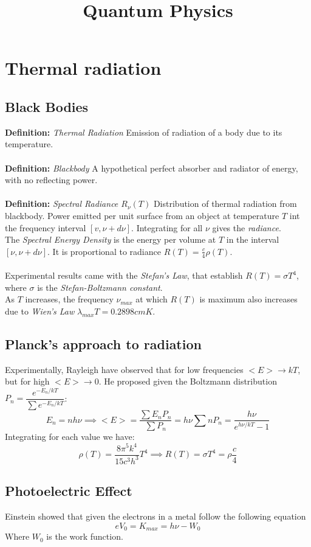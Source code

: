 \documentclass{myclass}
\title{Quantum Physics}
\newcommand{\defi}[1]{\textbf{Definition:} \textit{#1}}
\begin{document}
\maketitle
\tableofcontents
\newpage

\section{Thermal radiation}
\subsection{Black Bodies}
\defi{Thermal Radiation} Emission of radiation of a body due to its temperature. \\
\\
\defi{Blackbody} A hypothetical perfect absorber and radiator of energy, with no reflecting power.\\
\\
\defi{Spectral Radiance $R_\nu(T)$} Distribution of thermal radiation from blackbody. Power emitted per unit surface from an object at temperature $T$ int the frequency interval $[v, \nu + d\nu]$. Integrating for all $\nu$ gives the \textit{radiance}. \\
The \textit{Spectral Energy Density} is the energy per volume at $T$ in the interval $[\nu, \nu + d\nu]$. It is proportional to radiance $R(T)=\frac{c}{4}\rho(T)$. \\
\\
Experimental results came with the \textit{Stefan's Law}, that establish $R(T)=\sigma T^4$, where $\sigma$ is the \textit{Stefan-Boltzmann constant}. \\ As $T$ increases, the frequency $\nu_{max}$ at which $R(T)$ is maximum also increases due to \textit{Wien's Law} $\lambda_{max}T=0.2898 cmK$.

\subsection{Planck's approach to radiation}
Experimentally, Rayleigh have observed that for low frequencies $<E>\to kT$, but for high $<E>\to 0$. He proposed given the Boltzmann distribution $P_n=\dfrac{e^{-E_n/kT}}{\sum e^{-E_n/kT}}$:
$$
E_n=nh\nu \implies <E>=\frac{\sum E_nP_n}{\sum P_n}=h\nu\sum nP_n = \frac{h\nu}{e^{h\nu/kT}-1}
$$
Integrating for each value we have:
$$\rho(T)=\frac{8\pi^5k^4}{15c^3h^3}T^4 \implies R(T)=\sigma T^4 =\rho \frac{c}{4} $$

\subsection{Photoelectric Effect}
Einstein showed that given the electrons in a metal follow the following equation
$$
eV_0=K_{max} = h\nu -W_0
$$
Where $W_0$ is the work function.
\end{document}
